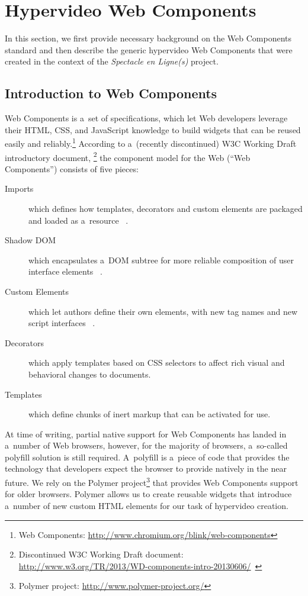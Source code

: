 \documentclass[runningheads,a4paper]{llncs}
\begin{document}
\section{Hypervideo Web Components}

In this section, we first provide necessary background on the Web Components standard
and then describe the generic hypervideo Web Components
that were created in the context of the \emph{Spectacle en Ligne(s)} project.

\subsection{Introduction to Web Components}

Web Components is a~set of specifications, which let Web developers leverage
their HTML, CSS, and JavaScript knowledge to build widgets
that can be reused easily and reliably.\footnote{Web Components:
\url{http://www.chromium.org/blink/web-components}}
According to a~(recently discontinued) W3C Working Draft introductory document,%
\footnote{Discontinued W3C Working Draft document:
\url{http://www.w3.org/TR/2013/WD-components-intro-20130606/}~\cite{cooney2013webcomponents}}
the component model for the Web (``Web Components'') consists of five pieces:

\begin{description}
  \item[Imports] which defines how templates, decorators and custom elements are packaged and loaded as a~resource%
  ~\cite{glazkov2014htmlimports}.
  \item[Shadow DOM] which encapsulates a~DOM subtree for more reliable composition of user interface elements%
  ~\cite{glazkov2014shadowdom}.    
  \item[Custom Elements] which let authors define their own elements, with new tag names and new script interfaces%
  ~\cite{glazkov2013customelements}.  
  \item[Decorators] which apply templates based on CSS selectors to affect rich visual and behavioral changes to documents.
  \item[Templates] which define chunks of inert markup that can be activated for use.  
\end{description}

\noindent At time of writing, partial native support for Web Components
has landed in a~number of Web browsers,
however, for the majority of browsers,
a~so-called polyfill solution is still required.
A~polyfill  is a~piece of code that provides the technology
that developers expect the browser to provide natively in the near future.
We rely on the Polymer project\footnote{Polymer project:
\url{http://www.polymer-project.org/}}
that provides Web Components support for older browsers.
Polymer allows us to create reusable widgets that introduce a~number of new
custom HTML elements for our task of hypervideo creation.
\end{document}
